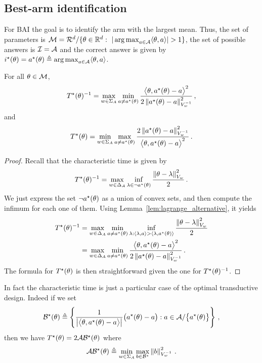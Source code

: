 \subsection{Best-arm identification}
\label{app:bai}
For BAI the goal is to identify the arm with the largest mean. Thus, the set of parameters is $\cM=\cR^d/\{\theta\in\R^d:\  |\argmax_{a\in\cA} \langle\theta,a\rangle|>1\}$, the set of possible answers is $\mathcal{I} = \mathcal{A}$ and the correct answer is given by $i^\star(\theta)=a^\star(\theta)\triangleq \operatorname*{arg\,max}_{a\in\mathcal{A}} \langle\theta,a\rangle$.
\begin{lemma}
\label{lem:complexity_bai}
For all $\theta\in \mathcal{M}$,
\[
T^{\star}(\theta)^{-1} = \max_{w\in\Sigma_A} \min_{a\neq a^\star(\theta)} \frac{\big\langle \theta, a^\star(\theta)-a\big\rangle^2}{2 \left\lVert a^\star(\theta)-a\right\rVert_{V_w^{-1}}^2}\,,
\]
and
\[
T^{\star}(\theta) = \min_{w\in\Sigma_A} \max_{a\neq a^\star(\theta)} \frac{2\left\lVert a^\star(\theta)-a\right\rVert_{V_w^{-1}}^2}{\big\langle \theta, a^\star(\theta)-a\big\rangle^2}\,.
\]
\end{lemma}
\begin{proof}
Recall that the characteristic time is given by
\[
T^{\star}(\theta)^{-1} = \max_{w \in \Delta_A} \inf_{\lambda\in \neg a^\star(\theta)} \frac{\left\lVert\theta - \lambda\right\rVert_{V_w}^2}{2}\,.
\]
We just express the set $\neg a^\star(\theta)$ as a union of convex sets, and then compute the infimum for each one of them. Using Lemma~\ref{lem:lagrange_alternative}, it yields
\begin{align*}
  T^{\star}(\theta)^{-1} &= \max_{w \in \Delta_A} \min_{a \neq a^\star(\theta)} \inf_{\lambda: \langle\lambda,a\rangle > \langle\lambda,a^\star(\theta)\rangle} \frac{\left\lVert\theta - \lambda\right\rVert_{V_w}^2}{2}\\
  &= \max_{w \in \Delta_A} \min_{a \neq a^\star(\theta)} \frac{\big\langle \theta, a^\star(\theta)-a\big\rangle^2}{2 \left\lVert a^\star(\theta)-a\right\rVert_{V_w^{-1}}^2}\,.
\end{align*}
The formula for $T^{\star}(\theta)$ is then straightforward given the one for  $T^{\star}(\theta)^{-1}$.

\end{proof}
In fact the characteristic time is just a particular case of the optimal transductive design. Indeed if we set
\[
\mathcal{B}^\star(\theta) \triangleq \left\{ \frac{1}{\left|\big\langle \theta, a^\star(\theta)-a\big\rangle\right|}\big(a^\star(\theta)- a\big): a\in\mathcal{A}/\big\{a^\star(\theta)\big\}  \right\}\,,
\]
then we have $T^{\star}(\theta) = 2 \mathcal{A}\mathcal{B}^\star(\theta)$ where
\[
\mathcal{A}\mathcal{B}^\star(\theta) \triangleq  \min_{w\in\Sigma_A} \max_{b\in \mathcal{B}^\star} \left\lVert b\right\rVert_{V_w^{-1}}^2\,.
\]

